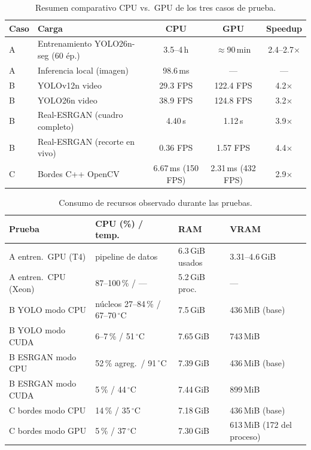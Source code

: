 \begin{table}[H]
\centering
\caption{Resumen comparativo CPU vs.\ GPU de los tres casos de prueba.}
\label{tab:global}
\setlength{\tabcolsep}{4.5pt}
\small
\begin{tabular}{llccc}
  \toprule
  \textbf{Caso} & \textbf{Carga} & \textbf{CPU} & \textbf{GPU} & \textbf{Speedup} \\
  \midrule
  A & Entrenamiento YOLO26n-seg (60 ép.) & 3.5--4\,h & $\approx$90\,min & 2.4--2.7$\times$ \\
  A & Inferencia local (imagen)          & 98.6\,ms  & ---              & --- \\
  B & YOLOv12n video                     & 29.3 FPS  & 122.4 FPS        & 4.2$\times$ \\
  B & YOLO26n video                      & 38.9 FPS  & 124.8 FPS        & 3.2$\times$ \\
  B & Real-ESRGAN (cuadro completo)      & 4.40\,s   & 1.12\,s          & 3.9$\times$ \\
  B & Real-ESRGAN (recorte en vivo)      & 0.36 FPS  & 1.57 FPS         & 4.4$\times$ \\
  C & Bordes C++ OpenCV                  & 6.67\,ms (150 FPS) & 2.31\,ms (432 FPS) & 2.9$\times$ \\
  \bottomrule
\end{tabular}
\end{table}

\begin{table}[H]
\centering
\caption{Consumo de recursos observado durante las pruebas.}
\label{tab:recursos}
\setlength{\tabcolsep}{4.5pt}
\small
\begin{tabular}{llll}
  \toprule
  \textbf{Prueba} & \textbf{CPU (\%) / temp.} & \textbf{RAM} & \textbf{VRAM} \\
  \midrule
  A entren.\ GPU (T4)      & pipeline de datos       & 6.3\,GiB usados & 3.31--4.6\,GiB \\
  A entren.\ CPU (Xeon)    & 87--100\,\% / ---       & 5.2\,GiB proc.\ & --- \\
  B YOLO modo CPU          & núcleos 27--84\,\% / 67--70\,$^{\circ}$C & 7.5\,GiB & 436\,MiB (base) \\
  B YOLO modo CUDA         & 6--7\,\% / 51\,$^{\circ}$C  & 7.65\,GiB & 743\,MiB \\
  B ESRGAN modo CPU        & 52\,\% agreg.\ / 91\,$^{\circ}$C & 7.39\,GiB & 436\,MiB (base) \\
  B ESRGAN modo CUDA       & 5\,\% / 44\,$^{\circ}$C     & 7.44\,GiB & 899\,MiB \\
  C bordes modo CPU        & 14\,\% / 35\,$^{\circ}$C    & 7.18\,GiB & 436\,MiB (base) \\
  C bordes modo GPU        & 5\,\% / 37\,$^{\circ}$C     & 7.30\,GiB & 613\,MiB (172 del proceso) \\
  \bottomrule
\end{tabular}
\end{table}

